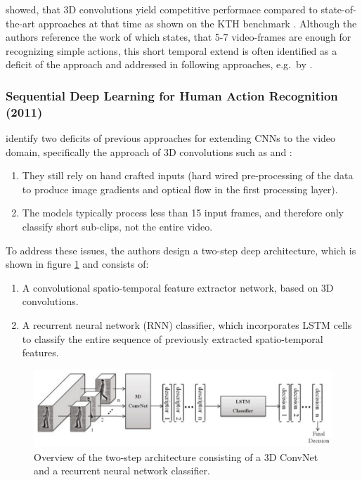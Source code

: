 \textcite{ji_3d_2013} showed, that 3D convolutions yield competitive performace compared to state-of-the-art approaches at that time as shown on the KTH benchmark \cite{schuldt_recognizing_2004}.
Although the authors reference the work of \textcite{schindler_action_2008} which states, that 5-7 video-frames are enough for recognizing simple actions, this short temporal extend is often identified as a deficit of the approach and addressed in following approaches, e.g.\ by \textcite{baccouche_sequential_2011}.


\subsubsection{Sequential Deep Learning for Human Action Recognition (2011)}
\textcite{baccouche_sequential_2011} identify two deficits of previous approaches for extending CNNs to the video domain, specifically the approach of 3D convolutions such as \cite{ji_3d_2013} and \cite{kim_human_2007}:
\begin{enumerate}
    \item They still rely on hand crafted inputs (hard wired pre-processing of the data to produce image gradients and optical flow in the first processing layer).
    \item The models typically process less than 15 input frames, and therefore only classify short sub-clips, not the entire video.
\end{enumerate}

To address these issues, the authors design a two-step deep architecture, which is shown in figure \ref{fig:sequentialdeep_overview} and consists of:
\begin{enumerate}
    \item A convolutional spatio-temporal feature extractor network, based on 3D convolutions.
    \item A recurrent neural network (RNN) classifier, which incorporates LSTM cells \cite{hochreiter_long_1997} to classify the entire sequence of previously extracted spatio-temporal features.
\end{enumerate}

\begin{figure}[H]
    \centering
    \includegraphics[width=\textwidth]{img_deep/sequentialdeep_overview.png}
    \caption{Overview of the two-step architecture consisting of a 3D ConvNet and a recurrent neural network classifier. \cite{baccouche_sequential_2011}}
    \label{fig:sequentialdeep_overview}
\end{figure}

